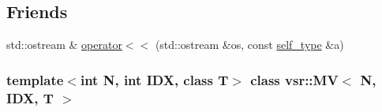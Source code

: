 \subsection*{Friends}
\begin{DoxyCompactItemize}
\item 
std\-::ostream \& \hyperlink{classvsr_1_1_m_v_a489ee0d08db921faaf9aab3707241bb9}{operator$<$$<$} (std\-::ostream \&os, const \hyperlink{classvsr_1_1_m_v}{self\-\_\-type} \&a)
\end{DoxyCompactItemize}
\subsubsection*{template$<$int N, int I\-D\-X, class T$>$ class vsr\-::\-M\-V$<$ N, I\-D\-X, T $>$}



